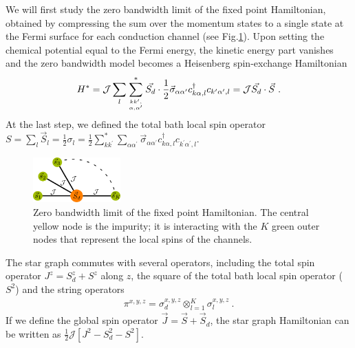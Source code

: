 \documentclass[reprint,prb,superscriptaddress]{revtex4-2}
\begin{document}
We will first study the zero bandwidth limit of the fixed point Hamiltonian, obtained by compressing the sum over the momentum states to a single state at the Fermi surface for each conduction channel (see Fig.\ref{fig:star graph}). Upon setting the chemical potential equal to the Fermi energy, the kinetic energy part vanishes and the zero bandwidth model becomes a Heisenberg spin-exchange Hamiltonian
\begin{equation}\begin{aligned}
	\label{star graph}
	H^* = {\mathcal{J}}\sum_l\sum_{kk^\prime,\atop{\alpha,\alpha^\prime}}^* \vec{S_d}\cdot\frac{1}{2}\vec{\sigma}_{\alpha\alpha^\prime}c_{k\alpha,l}^\dagger c_{k^\prime\alpha^\prime, l} = {\mathcal{J}}\vec{S_d}\cdot\vec S~.
\end{aligned}\end{equation}
At the last step, we defined the total bath local spin operator \(S = \sum_l \vec{S}_l = \frac{1}{2}\sigma_l = \frac{1}{2}\sum_{kk^\prime}^*\sum_{\alpha\alpha^\prime}\vec{\sigma}_{\alpha\alpha^\prime}c_{k\alpha,l}^\dagger c_{k^\prime\alpha^\prime, l}\).
\begin{figure}[htpb]
	\centering
	\includegraphics[width=0.30\textwidth]{stargraph.pdf}
	\caption{Zero bandwidth limit of the fixed point Hamiltonian. The central yellow node is the impurity; it is interacting with the \(K\) green outer nodes that represent the local spins of the channels.}
	\label{fig:star graph}
\end{figure}
The star graph commutes with several operators, including the total spin operator \(J^z = S_d^z + S^z\) along \(z\), the square of the total bath local spin operator (\(S^2\)) and the string operators 
\begin{equation}\begin{aligned}
\pi^{x,y,z} = \sigma_d^{x,y,z} \otimes_{l=1}^K \sigma_l^{x,y,z}~.
\end{aligned}\end{equation}
If we define the global spin operator \(\vec J = \vec S + \vec S_d\), the star graph Hamiltonian can be written as \(\frac{1}{2}\mathcal{J}\left[J^2 - S_d^2 - S^2\right] \).
\end{document}
